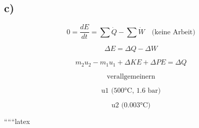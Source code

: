 

\subsection*{c)}

\[ 0 = \frac{dE}{dt} = \sum \dot{Q} - \sum \dot{W} \quad \text{(keine Arbeit)} \]

\[ \Delta E = \Delta Q - \Delta W \]

\[ m_2 u_2 - m_1 u_1 + \Delta KE + \Delta PE = \Delta Q \]

\[ \text{verallgemeinern} \]

\[ \text{u1 (500°C, 1.6 bar)} \]

\[ \text{u2 (0.003°C)} \]

``````latex